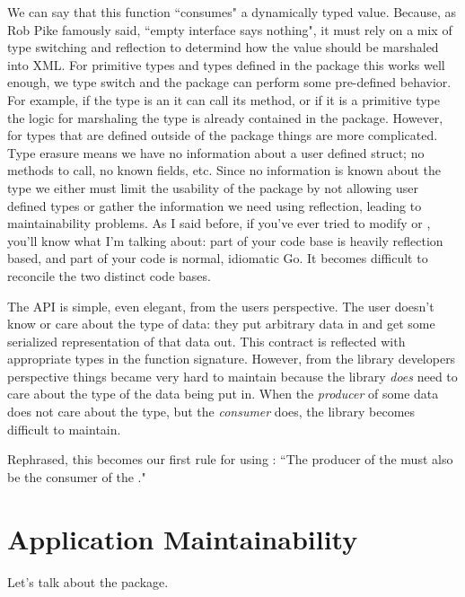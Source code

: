 \documentclass{article}
\begin{document}
We can say that this function ``consumes" a dynamically typed value.
Because, as Rob Pike famously said, ``empty interface says nothing", it must
rely on a mix of type switching and reflection to determind how the value should
be marshaled into XML.
For primitive types and types defined in the  package this
works well enough, we type switch and the package can perform some pre-defined
behavior.
For example, if the type is an  it can call its
 method, or if it is a primitive type the logic for
marshaling the type is already contained in the package.
However, for types that are defined outside of the  package
things are more complicated. Type erasure means we have no information about
a user defined struct; no methods to call, no known fields, etc.
Since no information is known about the type we either must limit the usability
of the package by not allowing user defined types or gather the information we
need using reflection, leading to maintainability problems.
As I said before, if you've ever tried to modify  or
, you'll know what I'm talking about: part of your code base
is heavily reflection based, and part of your code is normal, idiomatic Go.
It becomes difficult to reconcile the two distinct code bases.

The  API is simple, even elegant, from the users perspective.
The user doesn't know or care about the type of data: they put arbitrary data in
and get some serialized representation of that data out.
This contract is reflected with appropriate types in the function signature.
However, from the library developers perspective things became very hard to
maintain because the library \emph{does} need to care about the type of the data
being put in.
When the \emph{producer} of some data does not care about the type, but the
\emph{consumer} does, the library becomes difficult to maintain.

Rephrased, this becomes our first rule for using \interface:
``The producer of the \interface must also be the consumer of the \interface."

\section{Application Maintainability}

Let's talk about the  package.

\inputminted{go}{example2.go}
\end{document}
